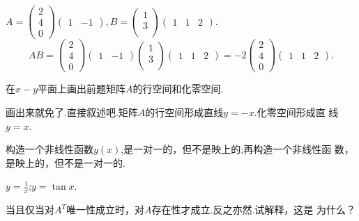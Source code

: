 ﻿\documentclass{book} \usepackage{exsheets} \usepackage{xeCJK}
\begin{document}
\begin{solution}
  $A=
  \begin{pmatrix}
    2\\
    4\\
    0
  \end{pmatrix}
  \begin{pmatrix}
    1&-1
  \end{pmatrix},B=
  \begin{pmatrix}
    1\\
    3\\
  \end{pmatrix}
  \begin{pmatrix}
    1&1&2
  \end{pmatrix}.  $
$$
AB=
\begin{pmatrix}
  2\\
  4\\
  0
\end{pmatrix}
\begin{pmatrix}
  1&-1
\end{pmatrix}
\begin{pmatrix}
  1\\
  3\\
\end{pmatrix}
\begin{pmatrix}
  1&1&2
\end{pmatrix}=-2
\begin{pmatrix}
  2\\
  4\\
  0
\end{pmatrix}
\begin{pmatrix}
  1&1&2
\end{pmatrix}.
$$
\end{solution}
\begin{question}
  在$x-y$平面上画出前题矩阵$A$的行空间和化零空间.
\end{question}
\begin{solution}
  画出来就免了.直接叙述吧.矩阵$A$的行空间形成直线$y=-x$.化零空间形成直
  线$y=x$.
\end{solution}
\begin{question}
  构造一个非线性函数$y(x)$,是一对一的，但不是映上的;再构造一个非线性函
  数，是映上的，但不是一对一的.
\end{question}
\begin{solution}
  $y=\frac{1}{x}$;$y=\tan x$.
\end{solution}
\begin{question}
  当且仅当对$A^T$唯一性成立时，对$A$存在性才成立.反之亦然.试解释，这是
  为什么？
\end{question}
\end{document}
